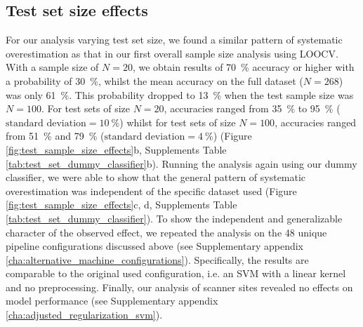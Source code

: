 \documentclass{article}
\begin{document}
    \subsection{Test set size effects}
    For our analysis varying test set size, we found a similar pattern of systematic overestimation as that in our first overall sample size analysis using LOOCV. With a sample size of $N=20$, we obtain results of \SI{70}{\percent} accuracy or higher with a probability of \SI{30}{\percent}, whilst the mean accuracy on the full dataset ($N=268$) was only \SI{61}{\percent}. This probability dropped to \SI{13}{\percent} when the test sample size was $N=100$. For test sets of size $N=20$, accuracies ranged from \SI{35}{\percent} to \SI{95}{\percent} ($\text{standard deviation}=\SI{10}{\percent}$) whilst for test sets of size $N=100$, accuracies ranged from \SI{51}{\percent} and \SI{79}{\percent} ($\text{standard deviation}=\SI{4}{\percent}$) (Figure \ref{fig:test_sample_size_effects}b, Supplements Table \ref{tab:test_set_dummy_classifier}b). Running the analysis again using our dummy classifier, we were able to show that the general pattern of systematic overestimation was independent of the specific dataset used (Figure \ref{fig:test_sample_size_effects}c, d, Supplements Table \ref{tab:test_set_dummy_classifier}). To show the independent and generalizable character of the observed effect, we repeated the analysis on the \num{48} unique pipeline configurations discussed above (see Supplementary appendix \ref{cha:alternative_machine_configurations}). Specifically, the results are comparable to the original used configuration, i.e. an SVM with a linear kernel and no preprocessing. Finally, our analysis of scanner sites revealed no effects on model performance (see Supplementary appendix \ref{cha:adjusted_regularization_svm}).
\end{document}

